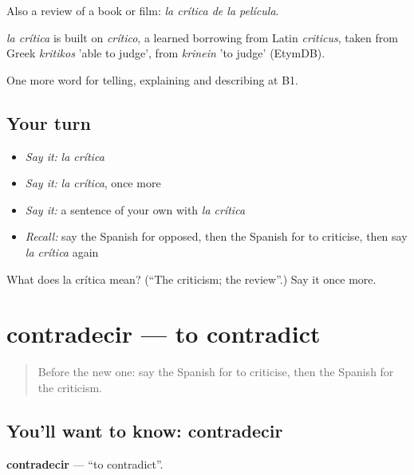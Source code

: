 Also a review of a book or film: \emph{la crítica de la película}.

\begin{cousinweb}
\emph{la crítica} is built on \emph{crítico}, a learned borrowing from Latin \emph{criticus}, taken from Greek \emph{kritikos} 'able to judge', from \emph{krinein} 'to judge' (EtymDB).
\end{cousinweb}

\begin{grammarlens}[title={What you've built}]
One more word for telling, explaining and describing at B1.
\end{grammarlens}

\subsection*{Your turn}
\begin{itemize}
\raggedright
  \item \emph{Say it:} \emph{la crítica}
  \item \emph{Say it:} \emph{la crítica}, once more
  \item \emph{Say it:} a sentence of your own with \emph{la crítica}
  \item \emph{Recall:} say the Spanish for opposed, then the Spanish for to criticise, then say \emph{la crítica} again
\end{itemize}

\begin{tcolorbox}[breakable,colback=teal!4,colframe=teal!35!black,title={Before you move on}]
What does la crítica mean? (\textquotedblleft{}The criticism; the review\textquotedblright{}.) Say it once more.
\end{tcolorbox}
\section[contradecir]{contradecir — to contradict}

\label{lesson:ES-C579-contradecir}



\begin{quote}
Before the new one: say the Spanish for to criticise, then the Spanish for the criticism.
\end{quote}

\subsection*{You'll want to know: contradecir}
\textbf{contradecir} — \textquotedblleft{}to contradict\textquotedblright{}.

